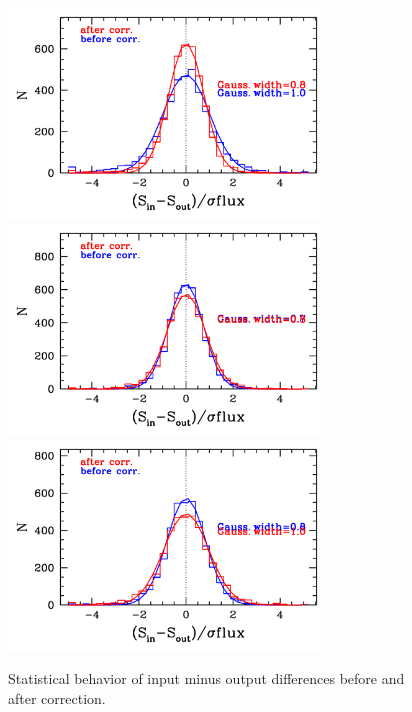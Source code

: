 \documentclass[11pt,a4paper]{article}
\begin{document}
\begin{figure}[H]
	\includegraphics[width=0.75\textwidth]{galsim_24_hist_dfcorr_1}
	\includegraphics[width=0.75\textwidth]{galsim_24_hist_dfcorr_2}
	\includegraphics[width=0.75\textwidth]{galsim_24_hist_dfcorr_3}
	\caption{Statistical behavior of input minus output differences before and after correction.}
\end{figure}


\clearpage

\end{document}
